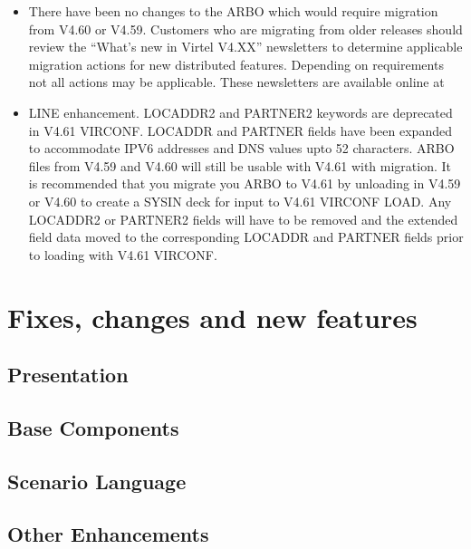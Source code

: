\documentclass[letterpaper,10pt,english]{sphinxmanual}
\begin{document}
\sphinxAtStartPar
{}
\begin{itemize}
\item {} 
\sphinxAtStartPar
There have been no changes to the ARBO which would require migration from V4.60 or V4.59. Customers who are migrating from older releases should review the “What’s new in Virtel V4.XX” newsletters to determine applicable migration actions for new distributed features. Depending on requirements not all actions may be applicable. These newsletters are available online at 

\item {} 
\sphinxAtStartPar
LINE enhancement. LOCADDR2 and PARTNER2 keywords are deprecated in V4.61 VIRCONF. LOCADDR and PARTNER fields have been expanded to accommodate IPV6 addresses and DNS values upto 52 characters. ARBO files from V4.59 and V4.60 will still be usable with V4.61 with migration. It is recommended that you migrate you ARBO to V4.61 by unloading in V4.59 or V4.60 to create a SYSIN deck for input to V4.61 VIRCONF LOAD. Any LOCADDR2 or PARTNER2 fields will have to be removed and the extended field data moved to the corresponding LOCADDR and PARTNER fields prior to loading with V4.61 VIRCONF.

\end{itemize}


\chapter{Fixes, changes and new features}
\label{\detokenize{TN202403:fixes-changes-and-new-features}}

\section{Presentation}
\label{\detokenize{TN202403:presentation}}
\newpage


\section{Base Components}
\label{\detokenize{TN202403:base-components}}
\newpage


\section{Scenario Language}
\label{\detokenize{TN202403:scenario-language}}
\newpage


\section{Other Enhancements}
\label{\detokenize{TN202403:other-enhancements}}
\newpage
\end{document}

